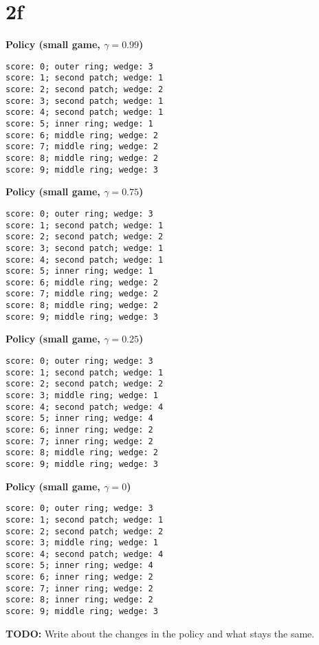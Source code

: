 \documentclass[12pt]{article}
\begin{document}
\section{2f}

\textbf{Policy (small game, $\gamma = 0.99$)}
\begin{verbatim}
score: 0; outer ring; wedge: 3
score: 1; second patch; wedge: 1
score: 2; second patch; wedge: 2
score: 3; second patch; wedge: 1
score: 4; second patch; wedge: 1
score: 5; inner ring; wedge: 1
score: 6; middle ring; wedge: 2
score: 7; middle ring; wedge: 2
score: 8; middle ring; wedge: 2
score: 9; middle ring; wedge: 3
\end{verbatim}

\textbf{Policy (small game, $\gamma = 0.75$)}
\begin{verbatim}
score: 0; outer ring; wedge: 3
score: 1; second patch; wedge: 1
score: 2; second patch; wedge: 2
score: 3; second patch; wedge: 1
score: 4; second patch; wedge: 1
score: 5; inner ring; wedge: 1
score: 6; middle ring; wedge: 2
score: 7; middle ring; wedge: 2
score: 8; middle ring; wedge: 2
score: 9; middle ring; wedge: 3
\end{verbatim}

\textbf{Policy (small game, $\gamma = 0.25$)}
\begin{verbatim}
score: 0; outer ring; wedge: 3
score: 1; second patch; wedge: 1
score: 2; second patch; wedge: 2
score: 3; middle ring; wedge: 1
score: 4; second patch; wedge: 4
score: 5; inner ring; wedge: 4
score: 6; inner ring; wedge: 2
score: 7; inner ring; wedge: 2
score: 8; middle ring; wedge: 2
score: 9; middle ring; wedge: 3
\end{verbatim}

\textbf{Policy (small game, $\gamma = 0$)}
\begin{verbatim}
score: 0; outer ring; wedge: 3
score: 1; second patch; wedge: 1
score: 2; second patch; wedge: 2
score: 3; middle ring; wedge: 1
score: 4; second patch; wedge: 4
score: 5; inner ring; wedge: 4
score: 6; inner ring; wedge: 2
score: 7; inner ring; wedge: 2
score: 8; inner ring; wedge: 2
score: 9; middle ring; wedge: 3
\end{verbatim}

\textbf{TODO:} Write about the changes in the policy and what stays the same.
\end{document}

